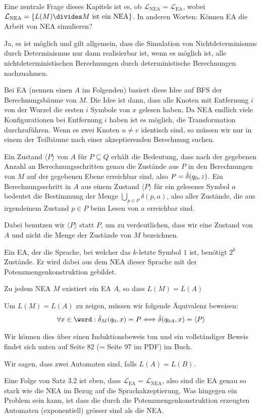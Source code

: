 Eine zentrale Frage dieses Kapitels ist es, ob $\mathcal{L}_{\text{NEA}} = \mathcal{L}_{\text{EA}}$, wobei $\mathcal{L}_{\text{NEA}} = \{ L(M) \divides M \text{ ist ein NEA} \}$.
In anderen Worten: Können EA die Arbeit von NEA simulieren? 

Ja, es ist möglich und gilt allgemein, dass die Simulation von Nichtdeterminismus durch Determinismus nur dann realisierbar ist, 
wenn es möglich ist, alle nichtdeterministischen Berechnungen durch deterministische Berechnungen nachzuahmen.

Bei EA (nennen einen $A$ im Folgenden) basiert diese Idee auf BFS der Berechnungsbäume von $M$.
Die Idee ist dann, dass alle Knoten mit Entfernung $i$ von der Wurzel die ersten $i$ Symbole von $x$ gelesen haben.
Da NEA endlich viele Konfigurationen bei Entfernung $i$ haben ist es möglich, die Transformation durchzuführen.
Wenn es zwei Knoten $u \neq v$ identisch sind, so müssen wir nur in einem der Teilbäume nach einer akzeptierenden Berechnung suchen.

 Ein Zustand $\langle P \rangle$ von $A$ für $P \subseteq Q$ erhält die Bedeutung,
dass nach der gegebenen Anzahl an Berechnungsschritten genau die Zustände aus $P$ in den Berechnungen von $M$ auf der gegebenen Ebene erreichbar sind, also $P = \hat{\delta}(q_0, z)$.
Ein Berechnungsschritt in $A$ aus einem Zustand $\langle P \rangle$ für ein gelesenes Symbol $a$ bedeutet die Bestimmung der Menge $\bigcup_{p \in P} \delta(p, a)$, 
also aller Zustände, die aus irgendeinem Zustand $p \in P$ beim Lesen von $a$ erreichbar sind.

Dabei benutzen wir $\langle P \rangle$ statt $P$, um zu verdeutlichen, dass wir eine Zustand von $A$ und nicht die Menge der Zustände von $M$ bezeichnen.

Ein EA, der die Sprache, bei welcher das $k$-letzte Symbol $1$ ist, benötigt $2^k$ Zustände. 
Er wird dabei aus dem NEA dieser Sprache mit der Potenzmengenkonstruktion gebildet.

\inlinetheorem Zu jedem NEA $M$ existiert ein EA $A$, so dass $L(M) = L(A)$

Um $L(M) = L(A)$ zu zeigen, müssen wir folgende Äquivalenz beweisen:
\rmvspace
\begin{align*}
    \forall x \in \word : \hdelta_M(q_0, x) = P \Longleftrightarrow \hdelta(q_{0 A}, x) = \langle P \rangle
\end{align*}

\rmvspace
Wir können dies über einen Induktionsbeweis tun und ein vollständiger Beweis findet sich unten auf Seite 82 (= Seite 97 im PDF) im Buch.

Wir sagen, dass zwei Automaten  sind, falls $L(A) = L(B)$.

Eine Folge von Satz 3.2 ist eben, dass $\mathcal{L}_{\text{EA}} = \mathcal{L}_{\text{NEA}}$, also sind die EA genau so stark wie die NEA im Bezug auf die Sprachakzeptierung.
Was hingegen ein Problem sein kann, ist dass die durch die Potenzmengenkonstruktion erzeugten Automaten (exponentiell) grösser sind als die NEA.

